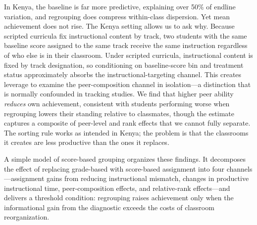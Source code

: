 \documentclass[11pt]{article}
\begin{document}
In Kenya, the baseline is far more predictive, explaining over 50\% of endline variation, and regrouping does compress within-class dispersion. Yet mean achievement does not rise. The Kenya setting allows us to ask why. Because scripted curricula fix instructional content by track, two students with the same baseline score assigned to the same track receive the same instruction regardless of who else is in their classroom. Under scripted curricula, instructional content is fixed by track designation, so conditioning on baseline-score bin and treatment status approximately absorbs the instructional-targeting channel. This creates leverage to examine the peer-composition channel in isolation---a distinction that is normally confounded in tracking studies. We find that higher peer ability \emph{reduces} own achievement, consistent with students performing worse when regrouping lowers their standing relative to classmates, though the estimate captures a composite of peer-level and rank effects that we cannot fully separate. The sorting rule works as intended in Kenya; the problem is that the classrooms it creates are less productive than the ones it replaces.

A simple model of score-based grouping organizes these findings. It decomposes the effect of replacing grade-based with score-based assignment into four channels---assignment gains from reducing instructional mismatch, changes in productive instructional time, peer-composition effects, and relative-rank effects---and delivers a threshold condition: regrouping raises achievement only when the informational gain from the diagnostic exceeds the costs of classroom reorganization.
\end{document}
